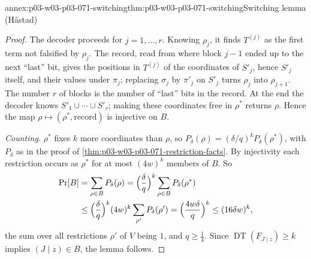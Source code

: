 \begin{annexitem}{annex:p03-w03-p03-071-switching}{thm:p03-w03-p03-071-switching}{Switching lemma (H\aa stad)}
\begin{proof}
The decoder proceeds for \(j=1,\ldots,r\).  Knowing \(\rho_j\), it finds
\(T^{(j)}\) as the first term not falsified by \(\rho_j\).  The record,
read from where block \(j-1\) ended up to the next ``last'' bit, gives the
positions in \(T^{(j)}\) of the coordinates of \(S'_j\), hence \(S'_j\)
itself, and their values under \(\pi_j\); replacing \(\sigma_j\) by
\(\pi'_j\) on \(S'_j\) turns \(\rho_j\) into \(\rho_{j+1}\).  The number
\(r\) of blocks is the number of ``last'' bits in the record.  At the end
the decoder knows \(S'_1\cup\cdots\cup S'_r\); making these coordinates
free in \(\rho^\ast\) returns \(\rho\).  Hence the map
\(\rho\mapsto(\rho^\ast,\text{record})\) is injective on \(B\).

\emph{Counting.}  \(\rho^\ast\) fixes \(k\) more coordinates than \(\rho\),
so \(P_\delta(\rho)=(\delta/q)^kP_\delta(\rho^\ast)\), with \(P_\delta\) as in
the proof of \cref{thm:p03-w03-p03-071-restriction-facts}.  By injectivity
each restriction occurs as \(\rho^\ast\) for at most \((4w)^k\) members of
\(B\).  So
\begin{align*}
  \Pr[B]&=\sum_{\rho\in B}P_\delta(\rho)
  =\Bigl(\frac\delta q\Bigr)^k\sum_{\rho\in B}P_\delta(\rho^\ast)\\
  &\leq\Bigl(\frac\delta q\Bigr)^k(4w)^k\sum_{\rho'}P_\delta(\rho')
  =\Bigl(\frac{4w\delta}q\Bigr)^k\leq(16\delta w)^k,
\end{align*}
the sum over all restrictions \(\rho'\) of \(V\) being \(1\), and \(q\geq
\frac14\).  Since \(\operatorname{DT}(F_{J\mid z})\geq k\) implies
\((J\mid z)\in B\), the lemma follows.
\end{proof}
\end{annexitem}

